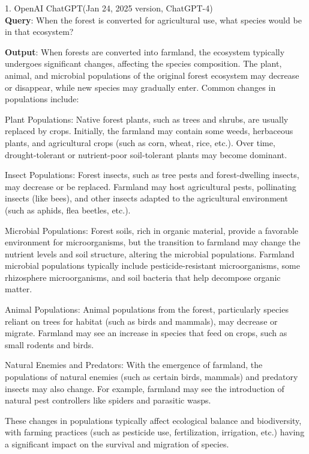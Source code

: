 \documentclass[12pt]{article}
\begin{document}
	
	\newpage
	1. OpenAI ChatGPT(Jan 24, 2025 version, ChatGPT-4)\\
	\hspace{2em}\textbf{Query}: When the forest is converted for agricultural use, what species would be in that ecosystem?
	
	\textbf{Output}: When forests are converted into farmland, the ecosystem typically undergoes significant changes, affecting the species composition. The plant, animal, and microbial populations of the original forest ecosystem may decrease or disappear, while new species may gradually enter. Common changes in populations include:
	
	Plant Populations: Native forest plants, such as trees and shrubs, are usually replaced by crops. Initially, the farmland may contain some weeds, herbaceous plants, and agricultural crops (such as corn, wheat, rice, etc.). Over time, drought-tolerant or nutrient-poor soil-tolerant plants may become dominant.
	
	Insect Populations: Forest insects, such as tree pests and forest-dwelling insects, may decrease or be replaced. Farmland may host agricultural pests, pollinating insects (like bees), and other insects adapted to the agricultural environment (such as aphids, flea beetles, etc.).
	
	Microbial Populations: Forest soils, rich in organic material, provide a favorable environment for microorganisms, but the transition to farmland may change the nutrient levels and soil structure, altering the microbial populations. Farmland microbial populations typically include pesticide-resistant microorganisms, some rhizosphere microorganisms, and soil bacteria that help decompose organic matter.
	
	Animal Populations: Animal populations from the forest, particularly species reliant on trees for habitat (such as birds and mammals), may decrease or migrate. Farmland may see an increase in species that feed on crops, such as small rodents and birds.
	
	Natural Enemies and Predators: With the emergence of farmland, the populations of natural enemies (such as certain birds, mammals) and predatory insects may also change. For example, farmland may see the introduction of natural pest controllers like spiders and parasitic wasps.
	
	These changes in populations typically affect ecological balance and biodiversity, with farming practices (such as pesticide use, fertilization, irrigation, etc.) having a significant impact on the survival and migration of species.
	
\end{document}
